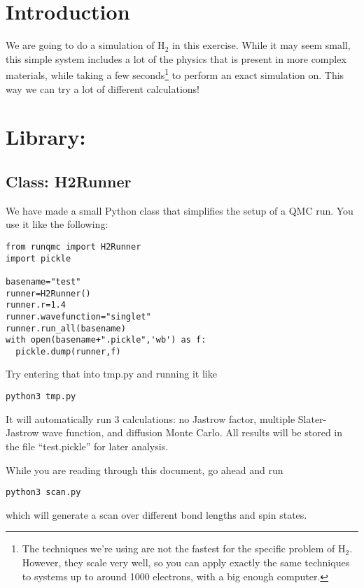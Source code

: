 \documentclass[12pt]{article}
\begin{document}
\section*{Introduction}

We are going to do a simulation of H$_2$ in this exercise. 
While it may seem small, this simple system includes a lot of the physics that is present in more complex materials, while taking a few seconds\footnote{The techniques we're using are not the fastest for the specific problem of H$_2$. However, they scale very well, so you can apply exactly the same techniques to systems up to around 1000 electrons, with a big enough computer.} to perform an exact simulation on. 
This way we can try a lot of different calculations!

\section*{Library: }

\subsection*{Class: H2Runner}

We have made a small Python class that simplifies the setup of a QMC run. You use it like the following:

\begin{verbatim}
from runqmc import H2Runner
import pickle

basename="test"
runner=H2Runner()
runner.r=1.4
runner.wavefunction="singlet"
runner.run_all(basename)
with open(basename+".pickle",'wb') as f:
  pickle.dump(runner,f)
\end{verbatim}

Try entering that into tmp.py and running it like
\begin{verbatim}
python3 tmp.py
\end{verbatim}
It will automatically run 3 calculations: no Jastrow factor, multiple Slater-Jastrow wave function, and diffusion Monte Carlo. 
All results will be stored in the file ``test.pickle'' for later analysis.

While you are reading through this document, go ahead and run 
\begin{verbatim}
python3 scan.py 	
\end{verbatim}
which will generate a scan over different bond lengths and spin states.
\end{document}
